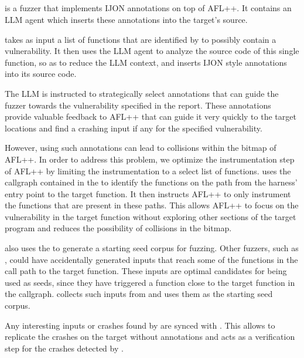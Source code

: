 \subsection{\aijon}
\label{aijon}

\aijon is a fuzzer that implements IJON\cite{aschermann2020ijon} annotations on top of AFL++.
It contains an LLM agent which inserts these annotations into the target's source.

\aijon takes as input a list of functions that are identified by \codeswipe to possibly contain a vulnerability.
It then uses the LLM agent to analyze the source code of this single function, so as to reduce the LLM context, and inserts IJON style annotations into its source code.

The LLM is instructed to strategically select annotations that can guide the fuzzer towards the vulnerability specified in the \codeswipe report.
These annotations provide valuable feedback to AFL++ that can guide it very quickly to the target locations and find a crashing input if any for the specified vulnerability.

However, using such annotations can lead to collisions within the bitmap of AFL++.
In order to address this problem, we optimize the instrumentation step of AFL++ by limiting the instrumentation to a select list of functions.
\aijon uses the callgraph contained in the \analysisgraph to identify the functions on the path from the harness' entry point to the target function.
It then instructs AFL++ to only instrument the functions that are present in these paths.
This allows AFL++ to focus on the vulnerability in the target function without exploring other sections of the target program and reduces the possibility of collisions in the bitmap.

\aijon also uses the \analysisgraph to generate a starting seed corpus for fuzzing.
Other fuzzers, such as \afluzzer, could have accidentally generated inputs that reach some of the functions in the call path to the target function.
These inputs are optimal candidates for being used as seeds, since they have triggered a function close to the target function in the callgraph.
\aijon collects such inputs from \analysisgraph and uses them as the starting seed corpus.

Any interesting inputs or crashes found by \aijon are synced with \afluzzer.
This allows \afluzzer to replicate the crashes on the target without annotations and acts as a verification step for the crashes detected by \aijon.